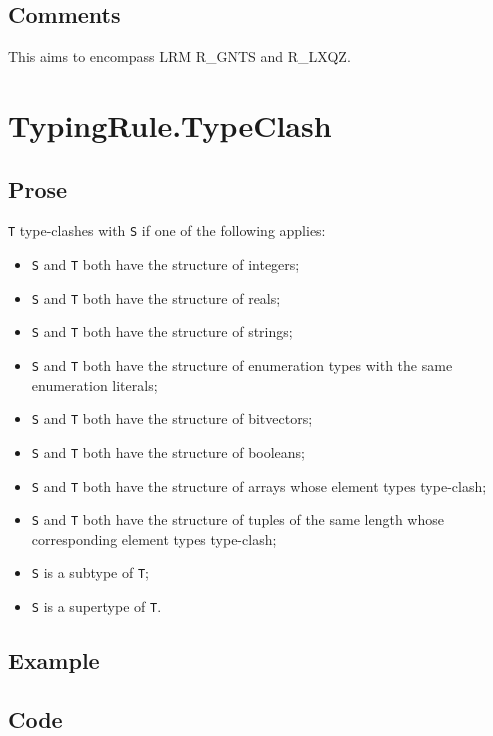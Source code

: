 \documentclass{book}
\begin{document}
\subsection{Comments}
  This aims to encompass LRM R\_GNTS and R\_LXQZ.

\section{TypingRule.TypeClash}

  \subsection{Prose}
  \texttt{T} type-clashes with \texttt{S} if one of the following applies:
  \begin{itemize}
  \item \texttt{S} and \texttt{T} both have the structure of integers;
  \item \texttt{S} and \texttt{T} both have the structure of reals;
  \item \texttt{S} and \texttt{T} both have the structure of strings;
  \item \texttt{S} and \texttt{T} both have the structure of enumeration types with the same enumeration literals;
  \item \texttt{S} and \texttt{T} both have the structure of bitvectors;
  \item \texttt{S} and \texttt{T} both have the structure of booleans;
  \item \texttt{S} and \texttt{T} both have the structure of arrays whose element types type-clash;
  \item \texttt{S} and \texttt{T} both have the structure of tuples of the same length whose
    corresponding element types type-clash;
  \item \texttt{S} is a subtype of \texttt{T};
  \item \texttt{S} is a supertype of \texttt{T}.
  \end{itemize}

  \subsection{Example}

  \subsection{Code}
\end{document}
